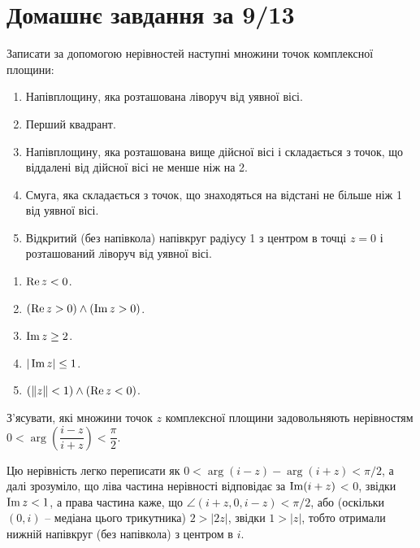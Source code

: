 \setcounter{section}{1}

\section{Домашнє завдання за 9/13}

\begin{problem}[1.14, Евграфов]
    Записати за допомогою нерівностей наступні множини точок комплексної площини:
    \begin{enumerate}
        \item Напівплощину, яка розташована ліворуч від уявної вісі.
        \item Перший квадрант.
        \item Напівплощину, яка розташована вище дійсної вісі і складається з точок, що віддалені від дійсної вісі не менше ніж на 2.
        \item Смуга, яка складається з точок, що знаходяться на відстані не більше ніж 1 від уявної вісі.
        \item Відкритий (без напівкола) напівкруг радіусу 1 з центром в точці $z = 0$ і розташований ліворуч від уявної вісі.
    \end{enumerate}
\end{problem}


\begin{solution}
    \begin{enumerate}
        \item $\operatorname{Re} z < 0$.
        \item $(\operatorname{Re} z > 0) \wedge (\operatorname{Im} z > 0)$.
        \item $\operatorname{Im} z \ge 2$.
        \item $|\operatorname{Im} z| \le 1$.
        \item $(\| z \| < 1) \wedge (\operatorname{Re} z < 0)$.
    \end{enumerate}
\end{solution}

\begin{problem}[1.21.5, Евграфов]
    З'ясувати, які множини точок $z$ комплексної площини задовольняють нерівностям $0 < \arg \left(\dfrac{i-z}{i+z}\right)<\dfrac\pi2$.
\end{problem}

\begin{solution}
    Цю нерівність легко переписати як $0 < \arg(i - z) - \arg(i + z) < \pi/2$, а далі зрозуміло, що ліва частина нерівності відповідає за $\operatorname{Im}(i + z)$ < 0, звідки $\operatorname{Im} z < 1$, а права частина каже, що $\angle(i + z, 0, i - z) < \pi/2$, або (оскільки $(0, i)$ -- медіана цього трикутника) $2 > |2z|$, звідки $1 > |z|$, тобто отримали нижній напівкруг (без напівкола) з центром в $i$.
\end{solution}

